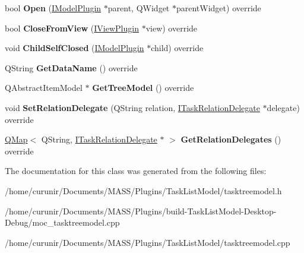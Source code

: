 \begin{DoxyCompactItemize}
\item 
bool {\bfseries Open} (\hyperlink{class_i_model_plugin}{I\+Model\+Plugin} $\ast$parent, Q\+Widget $\ast$parent\+Widget) override\hypertarget{class_task_tree_model_a7a2963fe56d9ef71711b7071dad49368}{}\label{class_task_tree_model_a7a2963fe56d9ef71711b7071dad49368}

\item 
bool {\bfseries Close\+From\+View} (\hyperlink{class_i_view_plugin}{I\+View\+Plugin} $\ast$view) override\hypertarget{class_task_tree_model_adb18285fd4cef22570af2d45b6e67d61}{}\label{class_task_tree_model_adb18285fd4cef22570af2d45b6e67d61}

\item 
void {\bfseries Child\+Self\+Closed} (\hyperlink{class_i_model_plugin}{I\+Model\+Plugin} $\ast$child) override\hypertarget{class_task_tree_model_a2404b109ceb9543d52e1362556db8b94}{}\label{class_task_tree_model_a2404b109ceb9543d52e1362556db8b94}

\item 
Q\+String {\bfseries Get\+Data\+Name} () override\hypertarget{class_task_tree_model_aebbc0558f83bc7f944cc6fc4ece03730}{}\label{class_task_tree_model_aebbc0558f83bc7f944cc6fc4ece03730}

\item 
Q\+Abstract\+Item\+Model $\ast$ {\bfseries Get\+Tree\+Model} () override\hypertarget{class_task_tree_model_a294c3881af033139a5387e3131a1bfb5}{}\label{class_task_tree_model_a294c3881af033139a5387e3131a1bfb5}

\item 
void {\bfseries Set\+Relation\+Delegate} (Q\+String relation, \hyperlink{class_i_task_tree_model_1_1_i_task_relation_delegate}{I\+Task\+Relation\+Delegate} $\ast$delegate) override\hypertarget{class_task_tree_model_afe93ae7affde7bc8ec07766556cb1f76}{}\label{class_task_tree_model_afe93ae7affde7bc8ec07766556cb1f76}

\item 
\hyperlink{class_q_map}{Q\+Map}$<$ Q\+String, \hyperlink{class_i_task_tree_model_1_1_i_task_relation_delegate}{I\+Task\+Relation\+Delegate} $\ast$ $>$ {\bfseries Get\+Relation\+Delegates} () override\hypertarget{class_task_tree_model_ab0438ecf0bc13627d229e63327f0e2bc}{}\label{class_task_tree_model_ab0438ecf0bc13627d229e63327f0e2bc}

\end{DoxyCompactItemize}


The documentation for this class was generated from the following files\+:\begin{DoxyCompactItemize}
\item 
/home/curunir/\+Documents/\+M\+A\+S\+S/\+Plugins/\+Task\+List\+Model/tasktreemodel.\+h\item 
/home/curunir/\+Documents/\+M\+A\+S\+S/\+Plugins/build-\/\+Task\+List\+Model-\/\+Desktop-\/\+Debug/moc\+\_\+tasktreemodel.\+cpp\item 
/home/curunir/\+Documents/\+M\+A\+S\+S/\+Plugins/\+Task\+List\+Model/tasktreemodel.\+cpp\end{DoxyCompactItemize}
